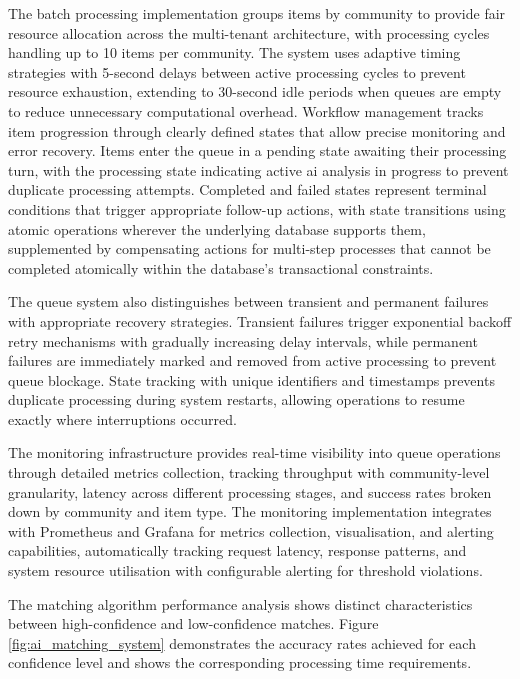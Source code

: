 The batch processing implementation groups items by community to provide fair resource allocation across the multi-tenant architecture, with processing cycles handling up to 10 items per community. The system uses adaptive timing strategies with 5-second delays between active processing cycles to prevent resource exhaustion, extending to 30-second idle periods when queues are empty to reduce unnecessary computational overhead. Workflow management tracks item progression through clearly defined states that allow precise monitoring and error recovery. Items enter the queue in a pending state awaiting their processing turn, with the processing state indicating active \ac{ai} analysis in progress to prevent duplicate processing attempts. Completed and failed states represent terminal conditions that trigger appropriate follow-up actions, with state transitions using atomic operations wherever the underlying database supports them, supplemented by compensating actions for multi-step processes that cannot be completed atomically within the database's transactional constraints.

The queue system also distinguishes between transient and permanent failures with appropriate recovery strategies. Transient failures trigger exponential backoff retry mechanisms with gradually increasing delay intervals, while permanent failures are immediately marked and removed from active processing to prevent queue blockage. State tracking with unique identifiers and timestamps prevents duplicate processing during system restarts, allowing operations to resume exactly where interruptions occurred.

The monitoring infrastructure provides real-time visibility into queue operations through detailed metrics collection, tracking throughput with community-level granularity, latency across different processing stages, and success rates broken down by community and item type. The monitoring implementation integrates with Prometheus and Grafana for metrics collection, visualisation, and alerting capabilities, automatically tracking request latency, response patterns, and system resource utilisation with configurable alerting for threshold violations.

The matching algorithm performance analysis shows distinct characteristics between high-confidence and low-confidence matches. Figure \ref{fig:ai_matching_system} demonstrates the accuracy rates achieved for each confidence level and shows the corresponding processing time requirements.

